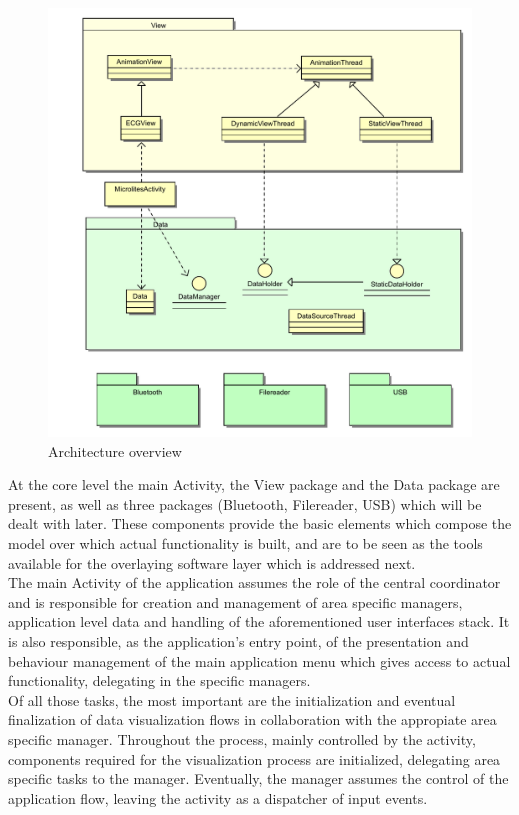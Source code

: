 		\begin{figure}[h]
		\includegraphics[scale=0.5]{mlts-arch-main}
		\centering
		\caption{Architecture overview}
		\label{fig:arch-global}
		\end{figure}

		At the core level the main Activity, the View package and the Data package are present, as well as three packages (Bluetooth, Filereader, USB) which will be dealt with later. These components provide the basic elements which compose the model over which actual functionality is built, and are to be seen as the tools available for the overlaying software layer which is addressed next.\\

		The main Activity of the application assumes the role of the central coordinator and is responsible for creation and management of area specific managers, application level data and handling of the aforementioned user interfaces stack. It is also responsible, as the application's entry point, of the presentation and behaviour management of the main application menu which gives access to actual functionality, delegating in the specific managers.\\
		
		Of all those tasks, the most important are the initialization and eventual finalization of data visualization flows in collaboration with the appropiate area specific manager. Throughout the process, mainly controlled by the activity, components required for the visualization process are initialized, delegating area specific tasks to the manager. Eventually, the manager assumes the control of the application flow, leaving the activity as a dispatcher of input events.\\

